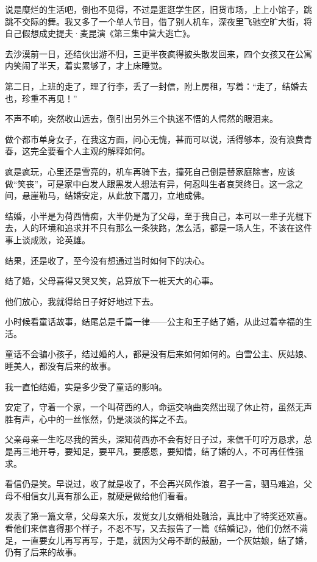 \par 说是糜烂的生活吧，倒也不见得，不过是逛逛学生区，旧货市场，上上小馆子，跳跳不交际的舞。我又多了一个单人节目，借了别人机车，深夜里飞驰空旷大街，将自己假想成史提夫·麦昆演《第三集中营大逃亡》。
\par 去沙漠前一日，还结伙出游不归，三更半夜疯得披头散发回来，四个女孩又在公寓内笑闹了半天，着实累够了，才上床睡觉。
\par 第二日，上班的走了，理了行李，丢了一封信，附上房租，写着：“走了，结婚去也，珍重不再见！”
\par 不声不响，突然收山远去，倒引出另外三个执迷不悟的人愕然的眼泪来。
\par 做个都市单身女子，在我这方面，问心无愧，甚而可以说，活得够本，没有浪费青春，这完全要看个人主观的解释如何。
\par 疯是疯玩，心里还是雪亮的，机车再骑下去，撞死自己倒是替家庭除害，应该做“笑丧”，可是家中白发人跟黑发人想法有异，何忍叫生者哀哭终日。这一念之间，悬崖勒马，结婚安定，从此放下屠刀，立地成佛。
\par 结婚，小半是为荷西情痴，大半仍是为了父母，至于我自己，本可以一辈子光棍下去，人的环境和追求并不只有那么一条狭路，怎么活，都是一场人生，不该在这件事上谈成败，论英雄。
\par 结果，还是收了，至今没有想通过当时如何下的决心。
\par 结了婚，父母喜得又哭又笑，总算放下一桩天大的心事。
\par 他们放心，我就得给日子好好地过下去。
\par 小时候看童话故事，结尾总是千篇一律——公主和王子结了婚，从此过着幸福的生活。
\par 童话不会骗小孩子，结过婚的人，都是没有后来如何如何的。白雪公主、灰姑娘、睡美人，都没有后来的故事。
\par 我一直怕结婚，实是多少受了童话的影响。
\par 安定了，守着一个家，一个叫荷西的人，命运交响曲突然出现了休止符，虽然无声胜有声，心中的一丝怅然，仍是淡淡的挥之不去。
\par 父亲母亲一生吃尽我的苦头，深知荷西亦不会有好日子过，来信千叮咛万恳求，总是再三地开导，要知足，要平凡，要感恩，要知情，结了婚的人，不可再任性强求。
\par 看信仍是笑。早说过，收了就是收了，不会再兴风作浪，君子一言，驷马难追，父母不相信女儿真有那么正，就硬是做给他们看看。
\par 发表了第一篇文章，父母亲大乐，发觉女儿女婿相处融洽，真比中了特奖还欢喜。看他们来信喜得那个样子，不忍不写，又去报告了一篇《结婚记》，他们仍然不满足，一直要女儿再写再写，于是，就因为父母不断的鼓励，一个灰姑娘，结了婚，仍有了后来的故事。
